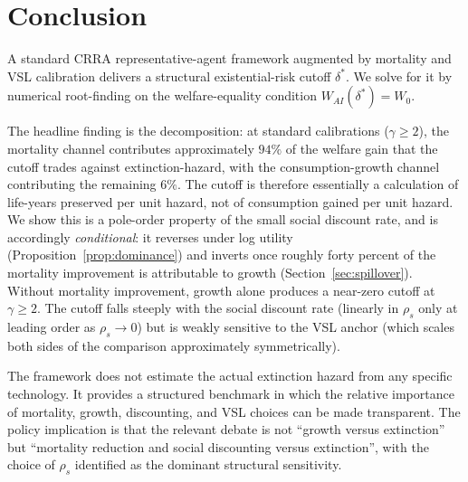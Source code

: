 \documentclass{_latex/house}
\begin{document}
\section{Conclusion}
\label{sec:conclusion}

A standard CRRA representative-agent framework augmented by mortality and VSL calibration delivers a structural existential-risk cutoff $\delta^*$. We solve for it by numerical root-finding on the welfare-equality condition $W_{AI}(\delta^*) = W_0$.

The headline finding is the decomposition: at standard calibrations ($\gamma\ge2$), the mortality channel contributes approximately $94\%$ of the welfare gain that the cutoff trades against extinction-hazard, with the consumption-growth channel contributing the remaining $6\%$. The cutoff is therefore essentially a calculation of life-years preserved per unit hazard, not of consumption gained per unit hazard. We show this is a pole-order property of the small social discount rate, and is accordingly \emph{conditional}: it reverses under log utility (Proposition~\ref{prop:dominance}) and inverts once roughly forty percent of the mortality improvement is attributable to growth (Section~\ref{sec:spillover}). Without mortality improvement, growth alone produces a near-zero cutoff at $\gamma \geq 2$. The cutoff falls steeply with the social discount rate (linearly in $\rho_s$ only at leading order as $\rho_s\to0$) but is weakly sensitive to the VSL anchor (which scales both sides of the comparison approximately symmetrically).

The framework does not estimate the actual extinction hazard from any specific technology. It provides a structured benchmark in which the relative importance of mortality, growth, discounting, and VSL choices can be made transparent. The policy implication is that the relevant debate is not ``growth versus extinction'' but ``mortality reduction and social discounting versus extinction'', with the choice of $\rho_s$ identified as the dominant structural sensitivity.



\end{document}
